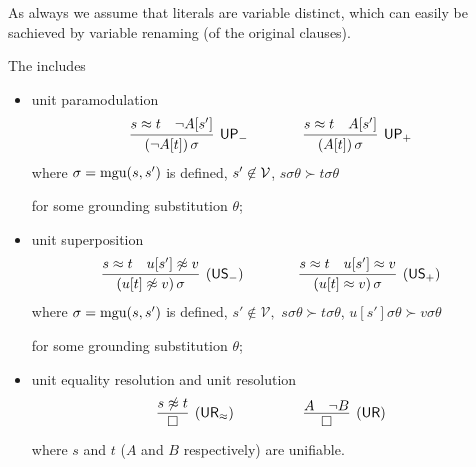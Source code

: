 
As always we assume that literals are variable distinct, 
	which can easily be sachieved by variable renaming (of the original clauses).


\begin{definition}\label{def:unit-superpositin-calculus}
	The  \cite{KS2010ijcar} includes
	\begin{itemize}
		\item unit paramodulation
		\begin{gather*}
		\infer
		[\mathsf{UP_-}]
		{(\lnot A[t])\,\sigma}
		{s\mEQ t&\lnot A[s']}
		\qquad\qquad
		\infer
		[\mathsf{UP_+}]
		{(A[t])\,\sigma}
		{s\mEQ t&A[s']}
		\end{gather*}
		where \( \sigma=\operatorname{mgu}(s,s') \) is defined,
		\( s'\not\in\mathcal{V} \),
		\( s\sigma\theta\succ t\sigma\theta \)

		for some grounding substitution \( \theta \);

		\item unit superposition
		\begin{gather*}
		\infer
		[\mathsf{(US_-)}]
		{(u[t]\mNE v)\,\sigma}
		{s\mEQ t&u[s']\mNE v}
		\qquad\qquad
		\infer
		[\mathsf{(US_+)}]
		{(u[t]\mEQ v)\,\sigma}
		{s\mEQ t&u[s']\mEQ v}
		\end{gather*}
		where \( \sigma=\operatorname{mgu}(s,s') \) is defined,
		\( s'\not\in\mathcal{V}, \)
		\( s\sigma\theta\succ t\sigma\theta \),
		\( u[s']\sigma\theta\succ v\sigma\theta \)

		for some grounding substitution \( \theta \);
		\item unit equality resolution and unit resolution
		\begin{gather*}
		\infer
		[\mathsf{(UR_\mEQ)}]
		{\emptyclause}
		{s\mNE t}
		\quad\quad\quad\qquad
		\infer
		[\mathsf{(UR)}]
		{\emptyclause}
		{A&\lnot B}
		\end{gather*}
		where \( s \) and \( t \) (\( A \) and \( B \) respectively) are unifiable.
	\end{itemize}
\end{definition}